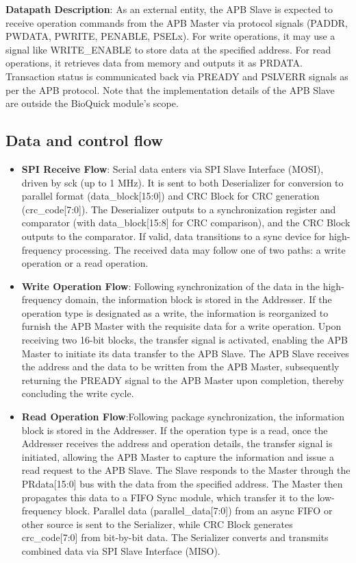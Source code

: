\textbf{Datapath Description}: As an external entity, the APB Slave is expected to receive operation commands from the APB Master via protocol signals (PADDR, PWDATA, PWRITE, PENABLE, PSELx). For write operations, it may use a signal like WRITE\_ENABLE to store data at the specified address. For read operations, it retrieves data from memory and outputs it as PRDATA. Transaction status is communicated back via PREADY and PSLVERR signals as per the APB protocol. Note that the implementation details of the APB Slave are outside the BioQuick module's scope.

\subsection{Data and control flow}

\begin{itemize}[nosep]
    \item \textbf{SPI Receive Flow}: Serial data enters via SPI Slave Interface (MOSI), driven by sck (up to 1 MHz). It is sent to both Deserializer for conversion to parallel format (data\_block[15:0]) and CRC Block for CRC generation (crc\_code[7:0]). The Deserializer outputs to a synchronization register and comparator (with data\_block[15:8] for CRC comparison), and the CRC Block outputs to the comparator. If valid, data transitions to a sync device for high-frequency processing. The received data may follow one of two paths: a write operation or a read operation.
    
    \item \textbf{Write Operation Flow}: Following synchronization of the data in the high-frequency domain, the information block is stored in the Addresser. If the operation type is designated as a write, the information is reorganized to furnish the APB Master with the requisite data for a write operation. Upon receiving two 16-bit blocks, the transfer signal is activated, enabling the APB Master to initiate its data transfer to the APB Slave. The APB Slave receives the address and the data to be written from the APB Master, subsequently returning the PREADY signal to the APB Master upon completion, thereby concluding the write cycle.
    
    \item \textbf{Read Operation Flow}:Following package synchronization, the information block is stored in the Addresser. If the operation type is a read, once the Addresser receives the address and operation details, the transfer signal is initiated, allowing the APB Master to capture the information and issue a read request to the APB Slave. The Slave responds to the Master through the PRdata[15:0] bus with the data from the specified address. The Master then propagates this data to a FIFO Sync module, which transfer it to the low-frequency block. Parallel data (parallel\_data[7:0]) from an async FIFO or other source is sent to the Serializer, while CRC Block generates crc\_code[7:0] from bit-by-bit data. The Serializer converts and transmits combined data via SPI Slave Interface (MISO).
    

\end{itemize}

